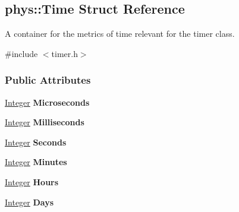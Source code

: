 \hypertarget{structphys_1_1Time}{
\subsection{phys::Time Struct Reference}
\label{de/db1/structphys_1_1Time}
}


A container for the metrics of time relevant for the timer class.  




{\ttfamily \#include $<$timer.h$>$}

\subsubsection*{Public Attributes}
\begin{DoxyCompactItemize}
\item 
\hypertarget{structphys_1_1Time_ad0e070fdec0d826d73dc01f5ee4dddc7}{
\hyperlink{namespacephys_a7f09bf5585b2bb97613cd9aad4273a81}{Integer} {\bfseries Microseconds}}
\label{de/db1/structphys_1_1Time_ad0e070fdec0d826d73dc01f5ee4dddc7}

\item 
\hypertarget{structphys_1_1Time_afeb0b8025b7cea824a84523565d7dd60}{
\hyperlink{namespacephys_a7f09bf5585b2bb97613cd9aad4273a81}{Integer} {\bfseries Milliseconds}}
\label{de/db1/structphys_1_1Time_afeb0b8025b7cea824a84523565d7dd60}

\item 
\hypertarget{structphys_1_1Time_aa526d7de0d2fde457dc458d7ee6285d1}{
\hyperlink{namespacephys_a7f09bf5585b2bb97613cd9aad4273a81}{Integer} {\bfseries Seconds}}
\label{de/db1/structphys_1_1Time_aa526d7de0d2fde457dc458d7ee6285d1}

\item 
\hypertarget{structphys_1_1Time_a142f48583baee67495ea65acf76cbdd5}{
\hyperlink{namespacephys_a7f09bf5585b2bb97613cd9aad4273a81}{Integer} {\bfseries Minutes}}
\label{de/db1/structphys_1_1Time_a142f48583baee67495ea65acf76cbdd5}

\item 
\hypertarget{structphys_1_1Time_aceeebc7a8950d38fb9c9bcf483a5a751}{
\hyperlink{namespacephys_a7f09bf5585b2bb97613cd9aad4273a81}{Integer} {\bfseries Hours}}
\label{de/db1/structphys_1_1Time_aceeebc7a8950d38fb9c9bcf483a5a751}

\item 
\hypertarget{structphys_1_1Time_aab43bd475fab9342887b0762281e80a4}{
\hyperlink{namespacephys_a7f09bf5585b2bb97613cd9aad4273a81}{Integer} {\bfseries Days}}
\label{de/db1/structphys_1_1Time_aab43bd475fab9342887b0762281e80a4}

\end{DoxyCompactItemize}


